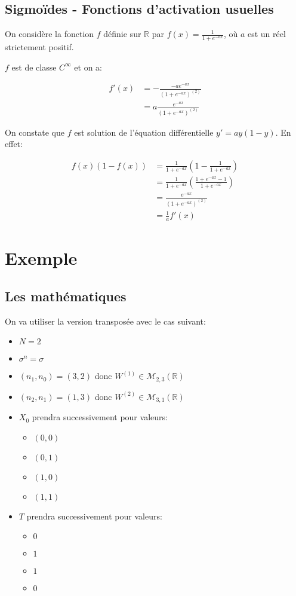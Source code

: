 \documentclass[11pt]{article}
\begin{document}
{\subsection{Sigmoïdes - Fonctions d'activation usuelles}
\label{sec-5-2}

On considère la fonction $f$ définie sur $\mathbb{R}$ par
$f(x)=\frac{1}{1+e^{-ax}}$, où $a$ est un réel strictement positif.

$f$ est de classe $C^{\infty}$ et on a:

\begin{align}
f'(x) & = -\frac{-ae^{-ax}}{(1+e^{-ax})^{(2)}}\\
& = a\frac{e^{-ax}}{(1+e^{-ax})^{(2)}}
\end{align}

On constate que $f$ est solution de l'équation différentielle $y'=ay(1-y)$. En
effet:

\begin{align}
f(x)(1-f(x)) & = \frac{1}{1+e^{-ax}}(1-\frac{1}{1+e^{-ax}})\\
& = \frac{1}{1+e^{-ax}}(\frac{1+e^{-ax}-1}{1+e^{-ax}})\\
& = \frac{e^{-ax}}{(1+e^{-ax})^{(2)}}\\
& = \frac{1}{a}f'(x)
\end{align}

\section{Exemple}
\label{sec-6}

\subsection{Les mathématiques}
\label{sec-6-1}

On va utiliser la version transposée avec le cas suivant:
\begin{itemize}
\item $N=2$
\item $\sigma^{n}=\sigma$
\item $(n_{1}, n_{0})=(3,2)$ donc $W^{(1)}\in\mathcal{M}_{2,3}(\mathbb{R})$
\item $(n_{2}, n_{1})=(1,3)$ donc $W^{(2)}\in\mathcal{M}_{3,1}(\mathbb{R})$
\item $X_{0}$ prendra successivement pour valeurs:
\begin{itemize}
\item $(0,0)$
\item $(0,1)$
\item $(1,0)$
\item $(1,1)$
\end{itemize}
\item $T$ prendra successivement pour valeurs:
\begin{itemize}
\item $0$
\item $1$
\item $1$
\item $0$
\end{itemize}
\end{itemize}

}
\end{document}
